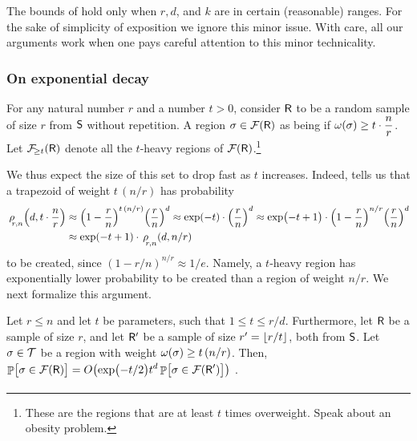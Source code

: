 \begin{remark}
    The bounds of  hold only when $r, d$, and
    $k$ are in certain (reasonable) ranges. For the sake of simplicity
    of exposition we ignore this minor issue. With care, all our
    arguments work when one pays careful attention to this minor
    technicality.
\end{remark}



\subsubsection{On exponential decay}

For any natural number $r$ and a number $t >0$, consider $\mathsf{R}$ to
be a random sample  of size $r$ from $\mathsf{S}$
without repetition.  A region $\Trap \in \RegionsSet{\Sample}$ as
being  if
$\WeightX{\Trap} \geq t \ds \cdot \frac{ n}{r}$. Let
$\RegionsHeavy{t}{\Sample}$ denote all the $t$-heavy regions of
$\RegionsSet{\Sample}$.\footnote{These are the regions that are at
   least $t$ times overweight. Speak about an obesity problem.} %

We thus expect the size of this set to drop fast as $t$
increases. Indeed,  tells us that a trapezoid
of weight $t\, (n/r)$ has probability
\begin{align*}
    \CSProbFull{r}{d}{t\cdot \frac{n}{r}}{n}%
    &\approx %
    \pth{1-\frac{r}{n}}^{t\,(n/r)} \pth{\frac{r}{n}}^d %
    \approx %
    \exp\pth{-t} \cdot \pth{\frac{r}{n}}^d %
    \approx %
    \exp\pth{\bigl.-t+1} \cdot \pth{1-\frac{r}{n}}^{n/r}
    \pth{\frac{r}{n}}^d%
    \\
    &\approx %
    \exp\pth{-t+1} \cdot \CSProbFull{r}{d}{n/r}{n}
\end{align*}
to be created, since $(1-r/n)^{n/r} \approx 1/e$. Namely, a $t$-heavy
region has exponentially lower probability to be created than a region
of weight $n/r$. We next formalize this argument.




\begin{lemma}
    Let $r \leq n$ and let $t$ be parameters, such that
    $1 \leq t \leq r/d$. Furthermore, let $\mathsf{R}$ be a sample of
    size $r$, and let $\mathsf{R}'$ be a sample of size $r'=\left\lfloor {r/t} \right\rfloor$,
    both from $\mathsf{S}$.  Let $\sigma \in \mathcal{T}$ be a region with
    weight $\WeightX{\Trap} \geq t\,(n/r)$.  Then,
    \begin{math}
        \Bigl.\ds \Prob{\bigl. \Trap \in \RegionsSet{\Sample}} =
        O\pth{ \exp\pth{-{t}/{2}\bigr.} t^d \,{\Prob{\bigl. \Trap \in
                 \RegionsSet{\SampleA}} } }
\end{math}
.
\end{lemma}


